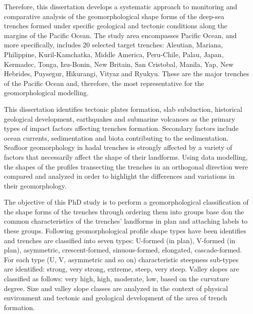 \documentclass[11pt,a4paper]{report}
\begin{document}
Therefore, this dissertation develops a systematic approach to monitoring and comparative analysis of the geomorphological shape forms of the deep-sea trenches formed under specific geological and tectonic conditions along the margins of the Pacific Ocean. The study area encompasses Pacific Ocean, and more specifically, includes 20 selected target trenches: Aleutian, Mariana, Philippine, Kuril-Kamchatka, Middle America, Peru-Chile, Palau, Japan, Kermadec, Tonga, Izu-Bonin, New Britain, San Cristobal, Manila, Yap, New Hebrides, Puysegur, Hikurangi, Vityaz and Ryukyu. These are the major trenches of the Pacific Ocean and, therefore, the most representative for the geomorphological modelling. \par
This dissertation identifies tectonic plates formation, slab subduction, historical geological development, earthquakes and submarine volcanoes as the primary types of impact factors affecting trenches formation. Secondary factors include ocean currents, sedimentation and biota contributing to the sedimentation. Seafloor geomorphology in hadal trenches is strongly affected by a variety of factors that necessarily affect the shape of their landforms. Using data modelling, the shapes of the profiles transecting the trenches in an orthogonal direction were compared and analyzed in order to highlight the differences and variations in their geomorphology. \par
The objective of this PhD study is to perform a geomorphological classification of the shape forms of the trenches through ordering them into groups base don the common characteristics of the trenches' landforms in plan and attaching labels to these groups. Following geomorphological profile shape types have been identifies and trenches are classified into seven types: U-formed (in plan), V-formed (in plan), asymmetric, crescent-formed, sinuous-formed, elongated, cascade-formed. For each type (U, V, asymmetric and so on) characteristic steepness sub-types are identified: strong, very strong, extreme, steep, very steep. Valley slopes are classified as follows: very high, high, moderate, low, based on the curvature degree. Size and valley slope classes are analyzed in the context of physical environment and tectonic and geological development of the area of trench formation. \par
\end{document}
